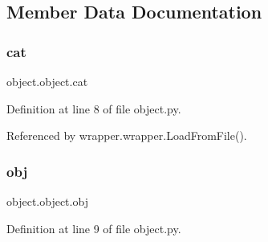 \subsection{Member Data Documentation}
\mbox{\label{classobject_1_1object_af114388a80cca208c152ffeca0e89e23}} 
\subsubsection{\texorpdfstring{cat}{cat}}
{\footnotesize\ttfamily object.\+object.\+cat\hspace{0.3cm}{\ttfamily [inherited]}}



Definition at line 8 of file object.\+py.



Referenced by wrapper.\+wrapper.\+Load\+From\+File().

\mbox{\label{classobject_1_1object_a82b61e7cd7e18b1f9de10fc832e5b75e}} 
\subsubsection{\texorpdfstring{obj}{obj}}
{\footnotesize\ttfamily object.\+object.\+obj\hspace{0.3cm}{\ttfamily [inherited]}}



Definition at line 9 of file object.\+py.



